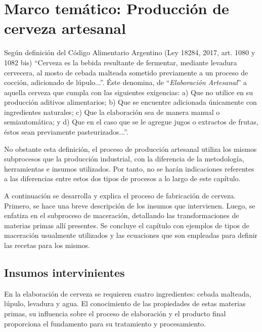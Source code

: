 \chapter{ Marco temático: Producción de cerveza artesanal}
    \label{MarcoTematico}
    \par Según definición del Código Alimentario Argentino (Ley 18284, 2017, art. 1080 y 1082 bis) “Cerveza es la bebida resultante de fermentar, mediante levadura cervecera, al mosto de cebada malteada sometido previamente a un proceso de cocción, adicionado de lúpulo...”. Éste denomina, de “\textit{Elaboración Artesanal}'' a aquella cerveza que cumpla con las siguientes exigencias: a) Que no utilice en su producción aditivos alimentarios; b) Que se encuentre adicionada únicamente con ingredientes naturales; c) Que la elaboración sea de manera manual o semiautomática; y d) Que en el caso que se le agregue jugos o extractos de frutas, éstos sean previamente pasteurizados...”. 
    
    \par No obstante esta definición, el proceso de producción artesanal utiliza los mismos subprocesos que la producción industrial, con la diferencia de la metodología, herramientas e insumos utilizados. Por tanto, no se harán indicaciones referentes a las diferencias entre estos dos tipos de procesos a lo largo de este capítulo. %
    
    \par A continuación se desarrolla y explica el proceso de fabricación de cerveza. Primero, se hace una breve descripción de los insumos que intervienen. Luego, se enfatiza en el subproceso de maceración, detallando las transformaciones de materias primas allí presentes. Se concluye el capítulo con ejemplos de tipos de maceración usualmente utilizados y las ecuaciones que son empleadas para definir las recetas para los mismos. %
    
    \section{Insumos intervinientes}
        \par En la elaboración de cerveza se requieren cuatro ingredientes: cebada malteada, lúpulo, levadura y agua. El conocimiento de las propiedades de estas materias primas, su influencia sobre el proceso de elaboración y el producto final proporciona el fundamento para su tratamiento  y  procesamiento.
        

